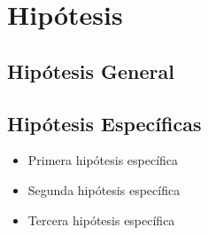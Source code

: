 \chapter{Hipótesis}
\section{Hipótesis General}

\section{Hipótesis Específicas}


 \begin{itemize}
	\item Primera hipótesis específica
	\item Segunda hipótesis específica
	\item Tercera hipótesis específica
 \end{itemize}
